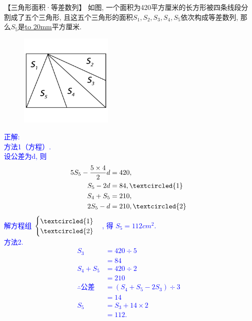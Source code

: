 \item {
    【三角形面积·等差数列】
    如图, 一个面积为420平方厘米的长方形被四条线段分割成了五个三角形, 且这五个三角形的面积$S_1, S_2, S_3, S_4, S_5$依次构成等差数列, 那么$S_5$是\underline{\hbox to 20mm{}}平方厘米.
    \begin{figure}[H] 
        \centering
        \includegraphics[width=0.4\textwidth]{./pics/Chapter_2/16.png}
    \end{figure}
    \ifshowSolution 
        \fangsong{}\textcolor{blue}{
            正解: \\
            方法1（方程）.\\
            设公差为d, 则 
            \begin{align*}
                5S_{5} - \frac{5\times 4}{2}d &= 420, \\
                S_{5} - 2d &= 84, \textcircled{1} \\
                S_{4} + S_{5} &= 210, \\
                2S_{5} - d &= 210, \textcircled{2} \\
            \end{align*}
            解方程组
                $\begin{cases}
                    \textcircled{1} \\ 
                    \textcircled{2}  
                \end{cases}$,
            得 $S_{5}=112 {cm}^2$.\\
            方法2.\\
            \begin{align*}
                S_{3} &= 420\div 5 \\
                &= 84 \\
                S_{4} + S_{5} &= 420\div 2\\
                &=210 \\
                \therefore 公差 &= (S_{4} + S_{5} - 2S_{3})\div 3\\
                &= 14\\
                S_{5} &= S_{3} + 14\times 2 \\
                &= 112.
            \end{align*}
        }
    \else
        \vspace{1cm}
    \fi
}

